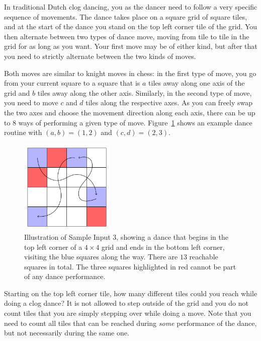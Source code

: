 
\newcommand{\maxn}{500}

In traditional Dutch clog dancing, you as the dancer need to follow a very specific sequence of movements.
The dance takes place on a square grid of square tiles, and at the start of the dance you stand on the top left corner tile of the grid.
You then alternate between two types of dance move, moving from tile to tile in the grid for as long as you want.
Your first move may be of either kind, but after that you need to strictly alternate between the two kinds of moves.

Both moves are similar to knight moves in chess:
in the first type of move, you go from your current square to a square that is $a$ tiles away along one axis of the grid and $b$ tiles away along the other axis.
Similarly, in the second type of move, you need to move $c$ and $d$ tiles along the respective axes.
As you can freely swap the two axes and choose the movement direction along each axis, there can be up to $8$ ways of performing a given type of move.
Figure~\ref{fig:clogdance} shows an example dance routine with $(a,b) = (1,2)$ and $(c,d) = (2,3)$.

\begin{figure}[!h]
  \centering
  \includegraphics[width=0.4\textwidth]{figure}
  \caption{
    Illustration of Sample Input 3, showing a dance that begins in the top left corner of a $4\times 4$ grid and ends in the bottom left corner, visiting the blue squares along the way.
    There are $13$ reachable squares in total.
    The three squares highlighted in red cannot be part of any dance performance.
  }
  \label{fig:clogdance}
\end{figure}

Starting on the top left corner tile, how many different tiles could you reach while doing a clog dance?
It is not allowed to step outside of the grid and you do not count tiles that you are simply stepping over while doing a move.
Note that you need to count all tiles that can be reached during \emph{some} performance of the dance, but not necessarily during the same one.

